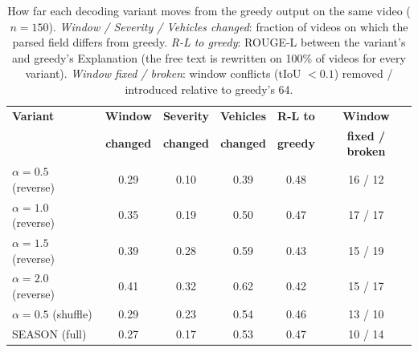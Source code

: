 \begin{table}[!t]
\centering
\caption{How far each decoding variant moves from the greedy output on the same video ($n{=}150$). \emph{Window / Severity / Vehicles changed}: fraction of videos on which the parsed field differs from greedy. \emph{R-L to greedy}: ROUGE-L between the variant's and greedy's Explanation (the free text is rewritten on 100\% of videos for every variant). \emph{Window fixed / broken}: window conflicts (tIoU $<0.1$) removed / introduced relative to greedy's 64.}
\label{tab:tcddiff}
\scriptsize
\setlength{\tabcolsep}{3.5pt}
\begin{tabular}{@{}lccccc@{}}
\toprule
\textbf{Variant} & \textbf{Window} & \textbf{Severity} & \textbf{Vehicles} & \textbf{R-L to} & \textbf{Window} \\
 & \textbf{changed} & \textbf{changed} & \textbf{changed} & \textbf{greedy} & \textbf{fixed / broken} \\
\midrule
\tcd{} $\alpha{=}0.5$ (reverse) & 0.29 & 0.10 & 0.39 & 0.48 & 16 / 12 \\
\tcd{} $\alpha{=}1.0$ (reverse) & 0.35 & 0.19 & 0.50 & 0.47 & 17 / 17 \\
\tcd{} $\alpha{=}1.5$ (reverse) & 0.39 & 0.28 & 0.59 & 0.43 & 15 / 19 \\
\tcd{} $\alpha{=}2.0$ (reverse) & 0.41 & 0.32 & 0.62 & 0.42 & 15 / 17 \\
\tcd{} $\alpha{=}0.5$ (shuffle) & 0.29 & 0.23 & 0.54 & 0.46 & 13 / 10 \\
SEASON (full)                   & 0.27 & 0.17 & 0.53 & 0.47 & 10 / 14 \\
\bottomrule
\end{tabular}
\end{table}
